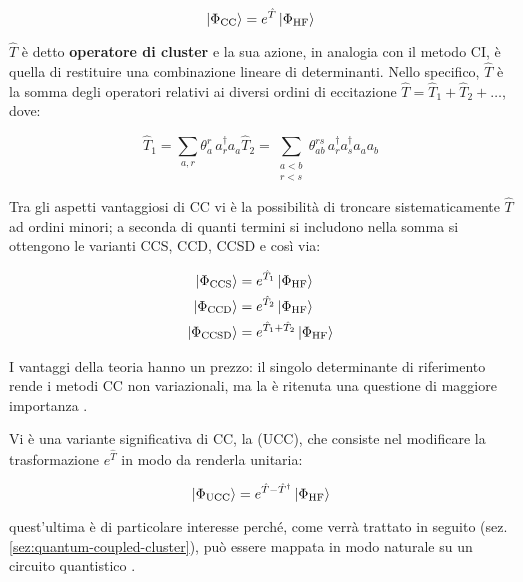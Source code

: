 \begin{equation}\label{eqn:coupled-cluster}
    \ket{\Phi_{\text{CC}}} = e^{\hat{T}} \ket{\Phi_{\text{HF}}}
\end{equation}

$\hat{T}$ è detto \textbf{operatore di cluster} e la sua azione, in analogia con il metodo CI, è quella di restituire una combinazione lineare di determinanti. Nello specifico, $\hat{T}$ è la somma degli operatori relativi ai diversi ordini di eccitazione $\hat{T} = \hat{T}_1 + \hat{T}_2 + \dots$, dove:

\begin{subequations}\label{eqn:cluster-operator}
\begin{equation}\label{eqn:cluster-operator-singles}
    \hat{T}_1 = \sum_{a,r} \theta_{a}^{r}\, a^{\dagger}_r a_a
\end{equation}

\begin{equation}\label{eqn:cluster-operator-doubles}
    \hat{T}_2 = \sum_{\substack{a<b\\r<s}} \theta_{ab}^{rs}\, a^{\dagger}_r a^{\dagger}_{s} a_a a_b
\end{equation}
\end{subequations}

Tra gli aspetti vantaggiosi di CC vi è la possibilità di troncare sistematicamente $\hat{T}$ ad ordini minori; a seconda di quanti termini si includono nella somma si ottengono le varianti CCS, CCD, CCSD e così via:

\begin{subequations}\label{eqn:CC-variants}
\begin{align}
    \ket{\Phi_{\text{CCS}}}  &= e^{\hat{T}_1} \ket{\Phi_{\text{HF}}}
    \\
    \ket{\Phi_{\text{CCD}}}  &= e^{\hat{T}_2} \ket{\Phi_{\text{HF}}}
    \\
    \ket{\Phi_{\text{CCSD}}} &= e^{\hat{T}_1 + \hat{T}_2} \ket{\Phi_{\text{HF}}}
\end{align}
\end{subequations}

I vantaggi della teoria  hanno un prezzo: il singolo determinante di riferimento rende i metodi CC non variazionali, ma la  è ritenuta una questione di maggiore importanza \cite{Pople_1998}.

Vi è una variante significativa di CC, la  (UCC), che consiste nel modificare la trasformazione $e^{\hat{T}}$ in modo da renderla unitaria:

\begin{equation}\label{eqn:unitary-coupled-cluster}
    \ket{\Phi_{\text{UCC}}} = e^{\hat{T}-\hat{T}^\dagger} \ket{\Phi_{\text{HF}}}
\end{equation}

quest'ultima è di particolare interesse perché, come verrà trattato in seguito (sez. \ref{sez:quantum-coupled-cluster}), può essere mappata in modo naturale su un circuito quantistico \cite{Sokolov_2020}.
